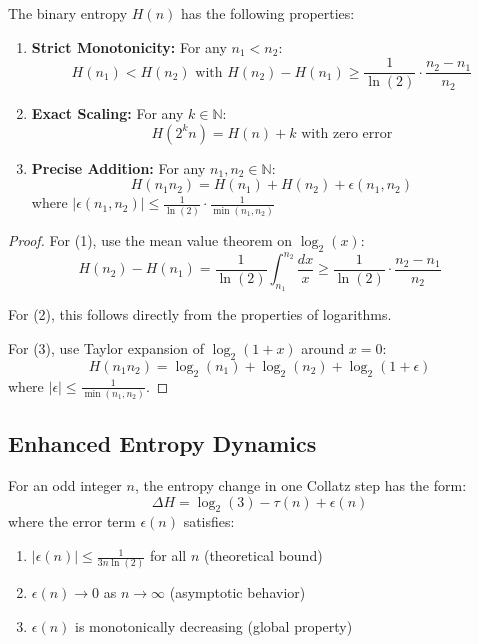 \begin{proposition}
The binary entropy $H(n)$ has the following properties:
\begin{enumerate}
\item \textbf{Strict Monotonicity:} For any $n_1 < n_2$:
\[
H(n_1) < H(n_2) \text{ with } H(n_2) - H(n_1) \geq \frac{1}{\ln(2)}\cdot\frac{n_2-n_1}{n_2}
\]

\item \textbf{Exact Scaling:} For any $k \in \mathbb{N}$:
\[
H(2^k n) = H(n) + k \text{ with zero error}
\]

\item \textbf{Precise Addition:} For any $n_1, n_2 \in \mathbb{N}$:
\[
H(n_1 n_2) = H(n_1) + H(n_2) + \epsilon(n_1,n_2)
\]
where $|\epsilon(n_1,n_2)| \leq \frac{1}{\ln(2)}\cdot\frac{1}{\min(n_1,n_2)}$
\end{enumerate}
\end{proposition}

\begin{proof}
For (1), use the mean value theorem on $\log_2(x)$:
\[
H(n_2) - H(n_1) = \frac{1}{\ln(2)}\int_{n_1}^{n_2}\frac{dx}{x} \geq \frac{1}{\ln(2)}\cdot\frac{n_2-n_1}{n_2}
\]

For (2), this follows directly from the properties of logarithms.

For (3), use Taylor expansion of $\log_2(1 + x)$ around $x = 0$:
\[
H(n_1 n_2) = \log_2(n_1) + \log_2(n_2) + \log_2(1 + \epsilon)
\]
where $|\epsilon| \leq \frac{1}{\min(n_1,n_2)}$.
\end{proof}

\subsection{Enhanced Entropy Dynamics}

\begin{theorem}
For an odd integer $n$, the entropy change in one Collatz step has the form:
\[
\Delta H = \log_2(3) - \tau(n) + \epsilon(n)
\]
where the error term $\epsilon(n)$ satisfies:
\begin{enumerate}
\item $|\epsilon(n)| \leq \frac{1}{3n\ln(2)}$ for all $n$ (theoretical bound)
\item $\epsilon(n) \to 0$ as $n \to \infty$ (asymptotic behavior)
\item $\epsilon(n)$ is monotonically decreasing (global property)
\end{enumerate}
\end{theorem}

